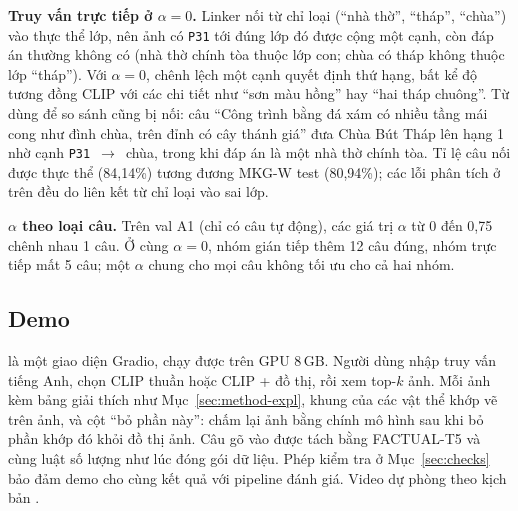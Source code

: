 \textbf{Truy vấn trực tiếp ở $\alpha=0$.} Linker nối từ chỉ loại (``nhà thờ'', ``tháp'', ``chùa'') vào thực thể lớp, nên ảnh
có \texttt{P31} tới đúng lớp đó được cộng một cạnh, còn đáp án thường không có (nhà thờ chính tòa thuộc lớp con; chùa có tháp
không thuộc lớp ``tháp''). Với $\alpha=0$, chênh lệch một cạnh quyết định thứ hạng, bất kể độ tương đồng CLIP với các chi
tiết như ``sơn màu hồng'' hay ``hai tháp chuông''. Từ dùng để so sánh cũng bị nối: câu ``Công trình bằng đá xám có nhiều tầng
mái cong như đình chùa, trên đỉnh có cây thánh giá'' đưa Chùa Bút Tháp lên hạng 1 nhờ cạnh \texttt{P31}~$\rightarrow$~chùa,
trong khi đáp án là một nhà thờ chính tòa. Tỉ lệ câu nối được thực thể (84,14\%) tương đương MKG-W test (80,94\%); các lỗi
phân tích ở trên đều do liên kết từ chỉ loại vào sai lớp.

\textbf{$\alpha$ theo loại câu.} Trên val A1 (chỉ có câu tự động), các giá trị $\alpha$ từ 0 đến 0{,}75 chênh nhau 1 câu. Ở
cùng $\alpha=0$, nhóm gián tiếp thêm 12 câu đúng, nhóm trực tiếp mất 5 câu; một $\alpha$ chung cho mọi câu không tối ưu cho
cả hai nhóm.

\subsection{Demo}
\label{sec:demo}

 là một giao diện Gradio, chạy được trên GPU 8\,GB. Người dùng nhập truy vấn tiếng Anh, chọn CLIP thuần
hoặc CLIP + đồ thị, rồi xem top-$k$ ảnh. Mỗi ảnh kèm bảng giải thích như Mục~\ref{sec:method-expl}, khung của các vật thể khớp
vẽ trên ảnh, và cột ``bỏ phần này'': chấm lại ảnh bằng chính mô hình sau khi bỏ phần khớp đó khỏi đồ thị ảnh. Câu gõ vào được
tách bằng FACTUAL-T5 và cùng luật số lượng như lúc đóng gói dữ liệu. Phép kiểm tra ở Mục~\ref{sec:checks} bảo đảm demo cho
cùng kết quả với pipeline đánh giá. Video dự phòng theo kịch bản .

